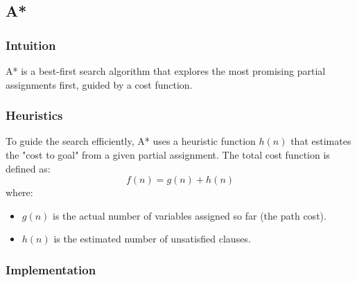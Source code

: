 \subsection{A*}

\subsubsection{Intuition}
A* is a best-first search algorithm that explores the most promising partial assignments first, guided by a cost function.

\subsubsection{Heuristics}
To guide the search efficiently, A* uses a heuristic function $h(n)$ that estimates the "cost to goal" from a given partial assignment. The total cost function is defined as:
\[
f(n) = g(n) + h(n)
\]
where:
\begin{itemize}
  \item $g(n)$ is the actual number of variables assigned so far (the path cost).
  \item $h(n)$ is the estimated number of unsatisfied clauses.
\end{itemize}

\subsubsection{Implementation}

